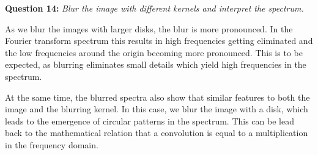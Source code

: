 




\textbf{Question 14:}
\textit{Blur the image with diﬀerent kernels and interpret the spectrum.}

As we blur the images with larger disks, the blur is more pronounced. In the Fourier transform spectrum this results in high frequencies getting eliminated and the low frequencies around the origin becoming more pronounced. This is to be expected, as blurring eliminates small details which yield high frequencies in the spectrum. 

At the same time, the blurred spectra also show that similar features to both the image and the blurring kernel. In this case, we blur the image with a disk, which leads to the emergence of circular patterns in the spectrum. This can be lead back to the mathematical relation that a convolution is equal to a multiplication in the frequency domain.

